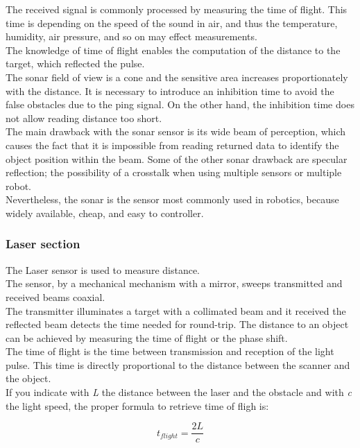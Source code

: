 The received signal is commonly processed by measuring the time of flight.
This time is depending on the speed of the sound in air, and thus the
temperature, humidity, air pressure, and so on may effect measurements.
\\
The knowledge of time of flight enables the computation of the distance
to the target, which reflected the pulse.
\\
The sonar field of view is a cone and the sensitive area increases proportionately
with the distance. It is necessary to introduce an inhibition time to avoid the false
obstacles due to the ping signal. On the other hand, the inhibition time does
not allow reading distance too short.
\\
The main drawback with the sonar sensor is its wide beam of perception, which
causes the fact that it is impossible from reading returned data to identify
the object position within the beam. Some of the other sonar drawback are specular
reflection; the possibility of a crosstalk when using multiple sensors
or multiple robot.
\\
Nevertheless, the sonar is the sensor most commonly used in robotics, because
widely available, cheap, and easy to controller.


\subsubsection{Laser section}
\label{sec:3morduc:laser}

The Laser sensor is used to measure distance.
\\
The sensor, by a mechanical mechanism with a mirror, sweeps
transmitted and received beams coaxial.
\\

The transmitter illuminates a target with a collimated beam
and it received the reflected beam detects the time needed for
round-trip. The distance to an object can be achieved by measuring
the time of flight or the phase shift.
\\
The time of flight is the time between transmission and reception
of the light pulse. This time is directly proportional to the distance
between the scanner and the object.
\\
If you indicate with \textit{L} the distance between the laser and
the obstacle and with \textit{c} the light speed, the proper formula
to retrieve time of fligh is:

\[
t_{flight} = \frac{2L}{c}
\]

